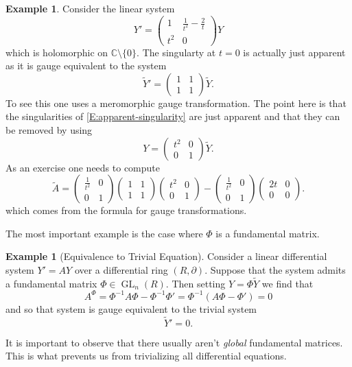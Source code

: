 \documentclass[12pt]{book}
\numberwithin{equation}{section}
\theoremstyle{definition}
\newtheorem{example}[theorem]{Example}
\theoremstyle{remark}
\newcommand{\CC}{\mathbb{C}}
\newcommand{\GL}{\operatorname{GL}}
\begin{document}
\begin{example}
	Consider the linear system 
	\begin{equation}\label{E:apparent-singularity} 
	Y' = \begin{pmatrix}1 & \frac{1}{t^2} -\frac{2}{t} \\ t^2 & 0 \end{pmatrix} Y
	\end{equation}
	which is holomorphic on $\CC\setminus \lbrace 0 \rbrace$. 
	The singularty at $t=0$ is actually just apparent as it is gauge equivalent to the system
	$$ \widetilde{Y}' = \begin{pmatrix} 1 & 1 \\
	1 & 1 
	\end{pmatrix} \widetilde{Y}.$$
	To see this one uses a meromorphic gauge transformation.
	The point here is that the singularities of \eqref{E:apparent-singularity} are just apparent and that they can be removed by using 
	$$ Y =\begin{pmatrix}t^2 & 0 \\ 0 & 1 \end{pmatrix} \widetilde{Y}. $$
	As an exercise one needs to compute 
	$$ \widetilde{A} = \begin{pmatrix} \frac{1}{t^2} & 0 \\
	0 & 1\end{pmatrix} \begin{pmatrix}1 & 1 \\ 1 & 1 \end{pmatrix} \begin{pmatrix} t^2 & 0 \\ 0 & 1 \end{pmatrix} - \begin{pmatrix} \frac{1}{t^2} & 0 \\ 0 & 1 \end{pmatrix} \begin{pmatrix} 2t & 0 \\
	0 & 0 \end{pmatrix}.$$
	which comes from the formula for gauge transformations.
\end{example}

The most important example is the case where $\Phi$ is a fundamental matrix. 
\begin{example}[Equivalence to Trivial Equation]\label{EX:equivalence-to-trivial}
	Consider a linear differential system $Y'=AY$ over a differential ring $(R,\partial)$. 
	Suppose that the system admits a fundamental matrix $\Phi \in \GL_n(R)$. 
	Then setting $Y = \Phi \widetilde{Y}$ we find that 
	$$ A^{\Phi} = \Phi^{-1} A \Phi - \Phi^{-1} \Phi' = \Phi^{-1}( A\Phi - \Phi') =0 $$
	and so that system is gauge equivalent to the trivial system 
	$$ \widetilde{Y}' =0.$$
\end{example}
It is important to observe that there usually aren't \emph{global} fundamental matrices.
This is what prevents us from trivializing all differential equations.
\end{document}
